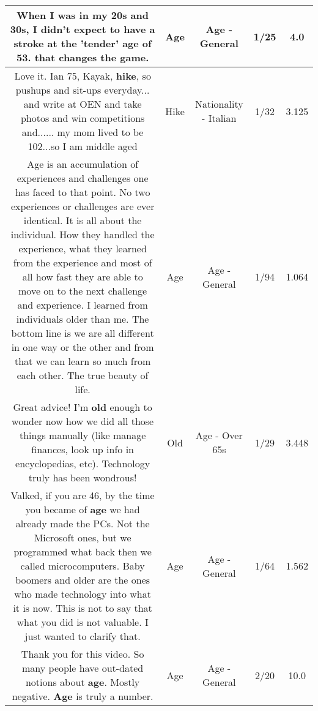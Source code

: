 \documentclass[11pt]{article}
\newlength\mylength
\begin{document}
\begin{center}
\begin{longtable}{|C{.65\mylength}|C{.30\mylength}|C{.12\mylength}|C{.12\mylength}|C{.12\mylength}|}
  \small When I was in my 20s and 30s, I didn't expect to have a stroke at the 'tender' \textbf{age} of 53. that changes the game.\normalsize   & Age & Age - General & 1/25 & 4.0 \\  \hline
  \small Love it. Ian 75, Kayak, \textbf{hike}, so pushups and sit-ups everyday... and write at OEN and take photos and win competitions and...... my mom lived to be 102...so I am middle aged\normalsize   & Hike & Nationality - Italian & 1/32 & 3.125 \\  \hline
  \small Age is an accumulation of experiences and challenges one has faced to that point. No two experiences or challenges are ever identical. It is all about the individual. How they handled the experience, what they learned from the experience and most of all how fast they are able to move on to the next challenge and experience. I learned from individuals older than me. The bottom line is we are all different in one way or the other and from that we can learn so much from each other. The true beauty of life.\normalsize   & Age & Age - General & 1/94 & 1.064 \\  \hline
  \small Great advice! I'm \textbf{old} enough to wonder now how we did all those things manually (like manage finances, look up info in encyclopedias, etc). Technology truly has been wondrous!\normalsize   & Old & Age - Over 65s & 1/29 & 3.448 \\  \hline
  \small Valked, if you are 46, by the time you became of \textbf{age} we had already made the PCs. Not the Microsoft ones, but we programmed what back then we called microcomputers. Baby boomers and older are the ones who made technology into what it is now. This is not to say that what you did is not valuable. I just wanted to clarify that.\normalsize   & Age & Age - General & 1/64 & 1.562 \\  \hline
  \small Thank you for this video. So many people have out-dated notions about \textbf{age}. Mostly negative. \textbf{Age} is truly a number.\normalsize   & Age & Age - General & 2/20 & 10.0 \\  \hline

\end{longtable}
\end{center}
\end{document}
